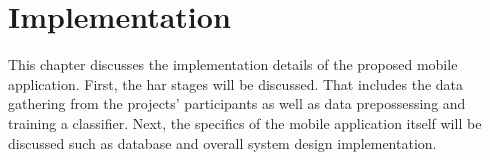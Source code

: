 \chapter{Implementation}
This chapter discusses the implementation details of the proposed mobile application. First, the \gls{har} stages will be discussed. That includes the data gathering from the projects' participants as well as data prepossessing and training a classifier. Next, the specifics of the mobile application itself will be discussed such as database and overall system design implementation.